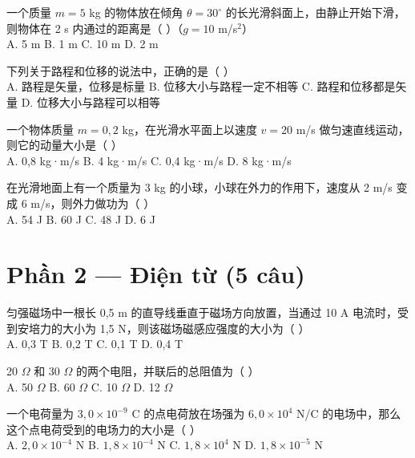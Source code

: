 \documentclass[11pt, a4paper]{article}
\begin{document}
\begin{baitap}[6]
一个质量 $m=5$ kg 的物体放在倾角 $\theta=30^\circ$ 的长光滑斜面上，由静止开始下滑，则物体在 2 s 内通过的距离是（ ）（$g=10$ m/s$^2$）\\[4pt]
A. 5 m \quad B. 1 m \quad C. 10 m \quad D. 2 m
\end{baitap}

\begin{baitap}[7]
下列关于路程和位移的说法中，正确的是（ ）\\[4pt]
A. 路程是矢量，位移是标量 \quad B. 位移大小与路程一定不相等 \quad C. 路程和位移都是矢量 \quad D. 位移大小与路程可以相等
\end{baitap}

\begin{baitap}[8]
一个物体质量 $m=0{,}2$ kg，在光滑水平面上以速度 $v=20$ m/s 做匀速直线运动，则它的动量大小是（ ）\\[4pt]
A. 0,8 kg·m/s \quad B. 4 kg·m/s \quad C. 0,4 kg·m/s \quad D. 8 kg·m/s
\end{baitap}

\begin{baitap}[9]
在光滑地面上有一个质量为 3 kg 的小球，小球在外力的作用下，速度从 2 m/s 变成 6 m/s，则外力做功为（ ）\\[4pt]
A. 54 J \quad B. 60 J \quad C. 48 J \quad D. 6 J
\end{baitap}

\section*{Phần 2 — Điện từ (5 câu)}

\begin{baitap}[10]
匀强磁场中一根长 0,5 m 的直导线垂直于磁场方向放置，当通过 10 A 电流时，受到安培力的大小为 1,5 N，则该磁场磁感应强度的大小为（ ）\\[4pt]
A. 0,3 T \quad B. 0,2 T \quad C. 0,1 T \quad D. 0,4 T
\end{baitap}

\begin{baitap}[11]
20 $\Omega$ 和 30 $\Omega$ 的两个电阻，并联后的总阻值为（ ）\\[4pt]
A. 50 $\Omega$ \quad B. 60 $\Omega$ \quad C. 10 $\Omega$ \quad D. 12 $\Omega$
\end{baitap}

\begin{baitap}[12]
一个电荷量为 $3{,}0\times10^{-9}$ C 的点电荷放在场强为 $6{,}0\times10^4$ N/C 的电场中，那么这个点电荷受到的电场力的大小是（ ）\\[4pt]
A. $2{,}0\times10^{-4}$ N \quad B. $1{,}8\times10^{-4}$ N \quad C. $1{,}8\times10^4$ N \quad D. $1{,}8\times10^{-5}$ N
\end{baitap}
\end{document}
